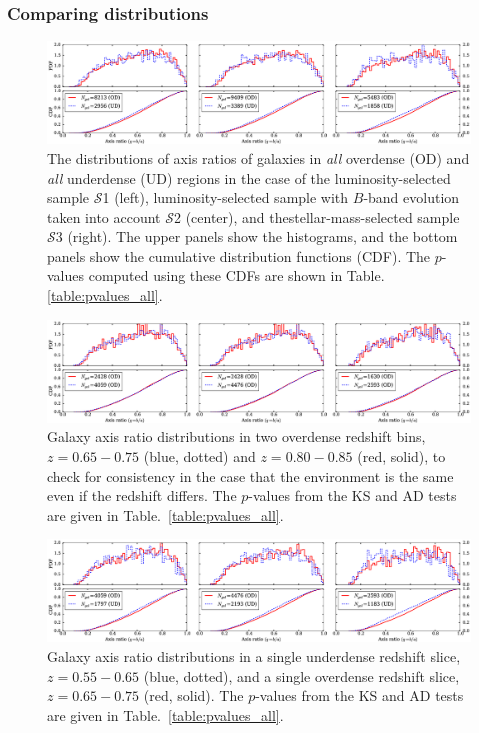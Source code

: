 \documentclass[twocolumn,useAMS,usenatbib]{mn2e}
\newcommand{\s}{\ensuremath{\mathcal{S}}}
\begin{document}
\subsubsection{Comparing distributions}
\label{subsubsec:compdist}
\begin{figure}
 \centering
 \includegraphics[width=2.2\columnwidth]{axis_ratio_all.eps}
 \caption{The distributions of axis ratios of galaxies in \emph{all}
   overdense (OD) and \emph{all} underdense (UD) regions in the case
   of the luminosity-selected sample \s1 (left), luminosity-selected
   sample with $B$-band evolution taken into account \s2 (center), and
   thestellar-mass-selected sample \s3 (right). The upper panels show
   the histograms, 
 and the bottom panels show the cumulative distribution functions
 (CDF). The $p$-values computed using these CDFs are shown in Table. \ref{table:pvalues_all}.}
 \label{fig:axisratio_all}
\end{figure}

\begin{figure}
 \centering
 \includegraphics[width=2.2\columnwidth]{axis_ratio_odod}
 \caption{Galaxy axis ratio
   distributions in two overdense redshift bins, $z=0.65-0.75$ (blue, dotted) and
   $z=0.80-0.85$ (red, solid), to check for consistency in the case that the
   environment is the same even if the redshift differs. The
   $p$-values from the KS and AD tests are given in
   Table.~\ref{table:pvalues_all}.}
 \label{fig:axisratio_similar}
\end{figure}

\begin{figure}
 \centering
 \includegraphics[width=2.2\columnwidth]{axis_ratio_odud}
 \caption{Galaxy axis ratio distributions in a single underdense redshift
   slice, $z=0.55-0.65$ (blue, dotted), and a single overdense redshift slice,
   $z=0.65-0.75$ (red, solid). The $p$-values from the
   KS and AD tests are given in Table.~\ref{table:pvalues_all}. }
 \label{fig:axisratio_contrasting}
\end{figure}
\end{document}
